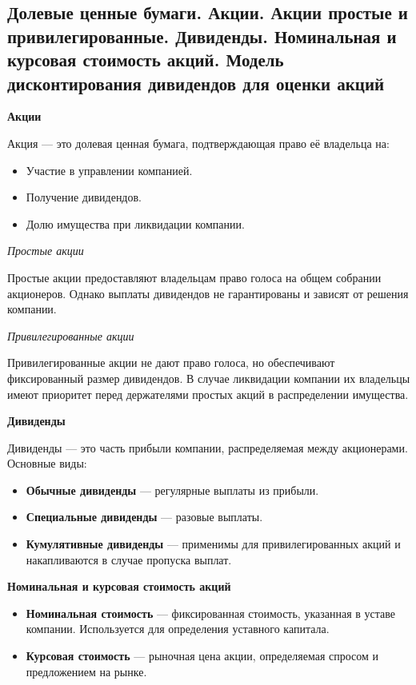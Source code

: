 \pagebreak
\subsection{Долевые ценные бумаги. Акции. Акции простые и привилегированные. Дивиденды. Номинальная и курсовая стоимость акций. Модель дисконтирования дивидендов для оценки акций}

\textbf{Акции}

Акция --- это долевая ценная бумага, подтверждающая право её владельца на:
\begin{itemize}
    \item Участие в управлении компанией.
    \item Получение дивидендов.
    \item Долю имущества при ликвидации компании.
\end{itemize}

\textit{Простые акции}

Простые акции предоставляют владельцам право голоса на общем собрании акционеров. Однако выплаты дивидендов не гарантированы и зависят от решения компании.

\textit{Привилегированные акции}

Привилегированные акции не дают право голоса, но обеспечивают фиксированный размер дивидендов. В случае ликвидации компании их владельцы имеют приоритет перед держателями простых акций в распределении имущества.

\textbf{Дивиденды}

Дивиденды --- это часть прибыли компании, распределяемая между акционерами. Основные виды:
\begin{itemize}
    \item \textbf{Обычные дивиденды} --- регулярные выплаты из прибыли.
    \item \textbf{Специальные дивиденды} --- разовые выплаты.
    \item \textbf{Кумулятивные дивиденды} --- применимы для привилегированных акций и накапливаются в случае пропуска выплат.
\end{itemize}

\textbf{Номинальная и курсовая стоимость акций}
\begin{itemize}
    \item \textbf{Номинальная стоимость} --- фиксированная стоимость, указанная в уставе компании. Используется для определения уставного капитала.
    \item \textbf{Курсовая стоимость} --- рыночная цена акции, определяемая спросом и предложением на рынке.
\end{itemize}

